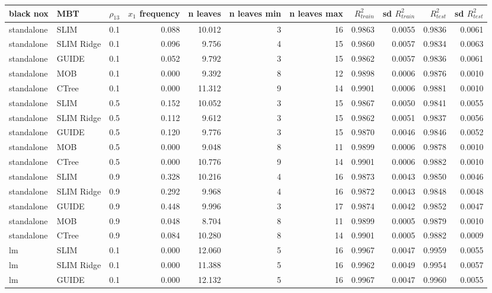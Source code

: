 \begin{table}[!htb]
\centering \tiny
\begin{tabular}[t]{l|l|r|r|r|r|r|r|r|r|r}
\hline
black nox & MBT & $\rho_{13}$ & $x_1$ frequency & n leaves & n leaves min & n leaves max & $R^2_{train}$  & sd $R^2_{train}$ & $R^2_{test}$ & sd $R^2_{test}$ \\
\hline
standalone & SLIM & 0.1 & 0.088 & 10.012 & 3 & 16 & 0.9863 & 0.0055 & 0.9836 & 0.0061\\
standalone & SLIM Ridge & 0.1 & 0.096 & 9.756 & 4 & 15 & 0.9860 & 0.0057 & 0.9834 & 0.0063\\
standalone & GUIDE & 0.1 & 0.052 & 9.792 & 3 & 15 & 0.9862 & 0.0057 & 0.9836 & 0.0061\\
standalone & MOB & 0.1 & 0.000 & 9.392 & 8 & 12 & 0.9898 & 0.0006 & 0.9876 & 0.0010\\
standalone & CTree & 0.1 & 0.000 & 11.312 & 9 & 14 & 0.9901 & 0.0006 & 0.9881 & 0.0010\\
\hline
standalone & SLIM & 0.5 & 0.152 & 10.052 & 3 & 15 & 0.9867 & 0.0050 & 0.9841 & 0.0055\\
standalone & SLIM Ridge & 0.5 & 0.112 & 9.612 & 3 & 15 & 0.9862 & 0.0051 & 0.9837 & 0.0056\\
standalone & GUIDE & 0.5 & 0.120 & 9.776 & 3 & 15 & 0.9870 & 0.0046 & 0.9846 & 0.0052\\
standalone & MOB & 0.5 & 0.000 & 9.048 & 8 & 11 & 0.9899 & 0.0006 & 0.9878 & 0.0010\\
standalone & CTree & 0.5 & 0.000 & 10.776 & 9 & 14 & 0.9901 & 0.0006 & 0.9882 & 0.0010\\
\hline
standalone & SLIM & 0.9 & 0.328 & 10.216 & 4 & 16 & 0.9873 & 0.0043 & 0.9850 & 0.0046\\
standalone & SLIM Ridge & 0.9 & 0.292 & 9.968 & 4 & 16 & 0.9872 & 0.0043 & 0.9848 & 0.0048\\
standalone & GUIDE & 0.9 & 0.448 & 9.996 & 3 & 17 & 0.9874 & 0.0042 & 0.9852 & 0.0047\\
standalone & MOB & 0.9 & 0.048 & 8.704 & 8 & 11 & 0.9899 & 0.0005 & 0.9879 & 0.0010\\
standalone & CTree & 0.9 & 0.084 & 10.280 & 8 & 14 & 0.9901 & 0.0005 & 0.9882 & 0.0009\\
\hline
lm & SLIM & 0.1 & 0.000 & 12.060 & 5 & 16 & 0.9967 & 0.0047 & 0.9959 & 0.0055\\
lm & SLIM Ridge & 0.1 & 0.000 & 11.388 & 5 & 16 & 0.9962 & 0.0049 & 0.9954 & 0.0057\\
lm & GUIDE & 0.1 & 0.000 & 12.132 & 5 & 16 & 0.9967 & 0.0047 & 0.9960 & 0.0055\\

\end{tabular}
\end{table}
